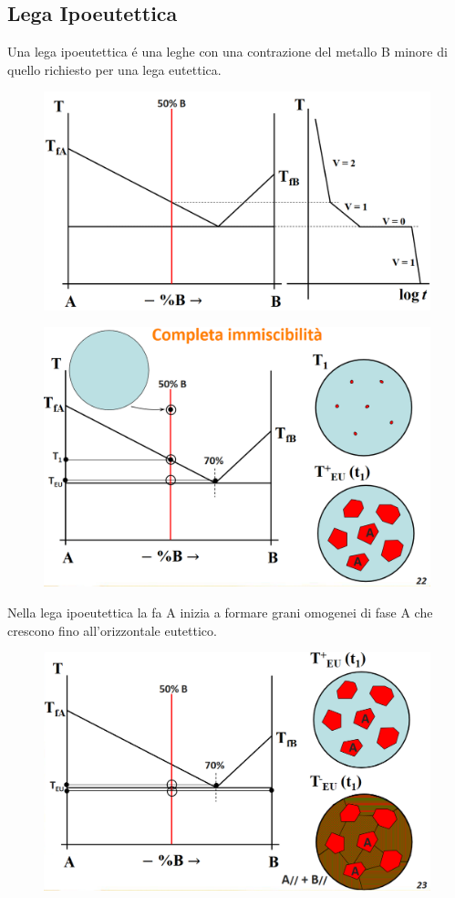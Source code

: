 \documentclass{article}
\begin{document}
{        \subsection{Lega Ipoeutettica}
            Una lega ipoeutettica \'e una leghe con una contrazione del metallo B minore di quello richiesto per una lega eutettica.
            \begin{figure}[h!]
                \centering
                \includegraphics[width=.85\linewidth]{Diagramma di stato di lega ipoeutettica e traiettoria di solidificazione.png}
            \end{figure}
            \begin{figure}[h!]
                \centering
                \includegraphics[width=.85\linewidth]{Cambio nella stuttura nella lega ipoeutettica da T0 a TEU.png}
            \end{figure}
            Nella lega ipoeutettica la fa A inizia a formare grani omogenei di fase A che crescono fino all'orizzontale eutettico.
            \begin{figure}[h!]
                \centering
                \includegraphics[width=.85\linewidth]{Cambio nella stuttura nella lega ipoeutettica attraverso TEU.png}

\end{figure}}
\end{document}
